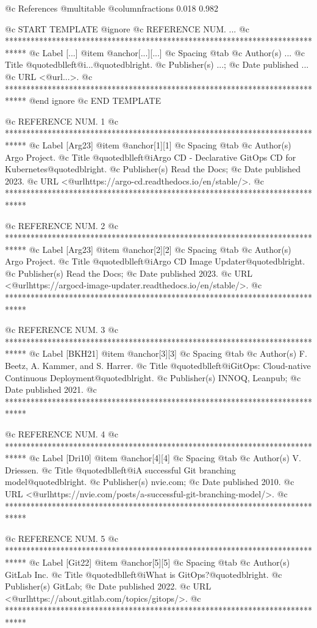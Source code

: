 @c References
@multitable @columnfractions 0.018 0.982


@c START TEMPLATE
@ignore
@c REFERENCE NUM. ...
@c *****************************************************************************
@c Label [...]
@item @anchor{[...]}[...]
@c Spacing
@tab
@c Author(s)
...
@c Title
@quotedblleft{}@i{...}@quotedblright{}.
@c Publisher(s)
...;
@c Date published
...
@c URL
<@url{...}>.
@c *****************************************************************************
@end ignore
@c END TEMPLATE


@c REFERENCE NUM. 1
@c *****************************************************************************
@c Label [Arg23]
@item @anchor{[1]}[1]
@c Spacing
@tab
@c Author(s)
Argo Project.
@c Title
@quotedblleft{}@i{Argo CD - Declarative GitOps CD for Kubernetes}@quotedblright{}.
@c Publisher(s)
Read the Docs;
@c Date published
2023.
@c URL
<@url{https://argo-cd.readthedocs.io/en/stable/}>.
@c *****************************************************************************

@c REFERENCE NUM. 2
@c *****************************************************************************
@c Label [Arg23]
@item @anchor{[2]}[2]
@c Spacing
@tab
@c Author(s)
Argo Project.
@c Title
@quotedblleft{}@i{Argo CD Image Updater}@quotedblright{}.
@c Publisher(s)
Read the Docs;
@c Date published
2023.
@c URL
<@url{https://argocd-image-updater.readthedocs.io/en/stable/}>.
@c *****************************************************************************

@c REFERENCE NUM. 3
@c *****************************************************************************
@c Label [BKH21]
@item @anchor{[3]}[3]
@c Spacing
@tab
@c Author(s)
F. Beetz, A. Kammer, and S. Harrer.
@c Title
@quotedblleft{}@i{GitOps: Cloud-native Continuous Deployment}@quotedblright{}.
@c Publisher(s)
INNOQ, Leanpub;
@c Date published
2021.
@c *****************************************************************************

@c REFERENCE NUM. 4
@c *****************************************************************************
@c Label [Dri10]
@item @anchor{[4]}[4]
@c Spacing
@tab
@c Author(s)
V. Driessen.
@c Title
@quotedblleft{}@i{A successful Git branching model}@quotedblright{}.
@c Publisher(s)
nvie.com;
@c Date published
2010.
@c URL
<@url{https://nvie.com/posts/a-successful-git-branching-model/}>.
@c *****************************************************************************

@c REFERENCE NUM. 5
@c *****************************************************************************
@c Label [Git22]
@item @anchor{[5]}[5]
@c Spacing
@tab
@c Author(s)
GitLab Inc.
@c Title
@quotedblleft{}@i{What is GitOps?}@quotedblright{}.
@c Publisher(s)
GitLab;
@c Date published
2022.
@c URL
<@url{https://about.gitlab.com/topics/gitops/}>.
@c *****************************************************************************

